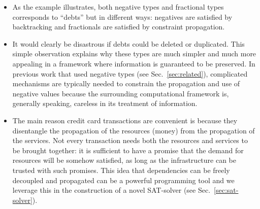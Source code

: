 \documentclass[preprint]{sigplanconf}
\begin{document}
\begin{itemize}
\item 
As the example illustrates, both negative types and fractional types
corresponds to ``debts'' but in different ways: negatives are satisfied
by backtracking and fractionals are satisfied by constraint
propagation.

\item 
It would clearly be disastrous if debts could be deleted or
duplicated. This simple observation explains why these types are much
simpler and much more appealing in a framework where information is
guaranteed to be preserved. In previous work that used negative types
(see Sec.~\ref{sec:related}), complicated mechanisms are typically
needed to constrain the propagation and use of negative values because
the surrounding computational framework is, generally speaking,
careless in its treatment of information.

\item The main reason credit card transactions are convenient is because they
  disentangle the propagation of the resources (money) from the propagation
  of the services. Not every transaction needs both the resources and
  services to be brought together: it is sufficient to have a promise that
  the demand for resources will be somehow satisfied, as long as the
  infrastructure can be trusted with such promises. This idea that
  dependencies can be freely decoupled and propagated can be a powerful
  programming tool and we leverage this in the construction of a novel
  SAT-solver (see Sec.~\ref{sec:sat-solver}).


\end{itemize}
\end{document}
